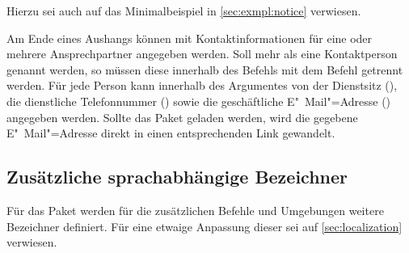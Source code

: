 \begin{Declaration*}{}
\begin{Example}
\begin{Code}[escapechar=§]
{  Bild (optional), einzubinden mit:
    \texttt{[image: §\\PName\{Datei]}§}
}{%
  \item Schwerpunkt 1
  \item Schwerpunkt 2
}
\end{Code}
Hierzu sei auch auf das Minimalbeispiel in \autoref{sec:exmpl:notice} verwiesen.
\end{Example}

\begin{Declaration}[v2.02]{}
\begin{Declaration}{}
\begin{Declaration}[v2.02]{}
\begin{Declaration}[v2.02]{}
\printdeclarationlist%
%
Am Ende eines Aushangs können mit  Kontaktinformationen 
für eine oder mehrere Ansprechpartner angegeben werden. Soll mehr als eine 
Kontaktperson genannt werden, so müssen diese innerhalb des Befehls
 mit dem Befehl  getrennt werden. Für jede 
Person kann innerhalb des Argumentes von  der Dienstsitz 
(), die dienstliche Telefonnummer () sowie die 
geschäftliche E"~Mail"=Adresse () angegeben werden. Sollte 
das Paket  geladen werden, wird die gegebene E"~Mail"=Adresse 
direkt in einen entsprechenden Link gewandelt.
\end{Declaration}
\end{Declaration}
\end{Declaration}
\end{Declaration}


\subsection{Zusätzliche sprachabhängige Bezeichner}
Für das Paket  werden für die zusätzlichen Befehle 
und Umgebungen weitere Bezeichner definiert. Für eine etwaige Anpassung dieser 
sei auf \autoref{sec:localization} verwiesen.


\end{Declaration*}
